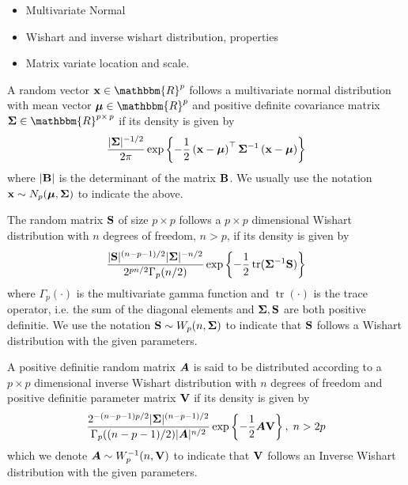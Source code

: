 \documentclass[]{book}\usepackage{knitr}
\begin{document}
\begin{itemize}
	\item Multivariate Normal
	\item Wishart and inverse wishart distribution, properties
	\item Matrix variate location and scale. 
\end{itemize}

\begin{definition}
	A random vector $\bx \in \mathbbm{R}^p$ follows a multivariate normal distribution with mean vector $\bmu \in \mathbbm{R}^p$ and positive definite covariance matrix  $\bSigma \in \mathbbm{R}^{p \times\, p}$ if its density is given by 
	\begin{equation}\label{eqn:multi_density}
	\frac{|\mathbf{\Sigma}|^{-1/2}}{2\pi} \exp \left\{-\frac{1}{2} \left(\mathbf{x} - \mbox{\boldmath$\mu$} \right)^\top\mathbf{\Sigma}^{-1}\left(\mathbf{x} - \mbox{\boldmath$\mu$} \right) \right\}
	\end{equation}
	where $|\mathbf{B}|$ is the determinant of the matrix $\mathbf{B}$. We usually use the notation $\mathbf{x} \sim N_p(\mbox{\boldmath$\mu$}, \mathbf{\Sigma})$ to indicate the above.
\end{definition} 

\begin{definition}
	The random matrix $\mathbf{S}$ of size $p \times p$ follows a $p\times p$ dimensional Wishart distribution with $n$ degrees of freedom, $n > p$, if its density is given by
	\begin{equation}\label{eqn:wishart_density}
	\frac{|\mathbf{S}|^{(n-p-1)/2} |\mathbf{\Sigma}|^{- n/2} }{2^{pn/2} \Gamma_p (n/2) } \exp\left\{-\frac{1}{2} \operatorname{tr}(\mathbf{\Sigma}^{-1}\mathbf{S})  \right\}
	\end{equation}
	where $ \Gamma_p (\cdot) $ is the multivariate gamma function and $\operatorname{tr}(\cdot)$ is the trace operator, i.e. the sum of the diagonal elements and $\mathbf{\Sigma}, \mathbf{S}$ are both positive definitie. We use the notation $\mathbf{S} \sim W_p(n, \mathbf{\Sigma})$ to indicate that $\mathbf{S}$ follows a Wishart distribution with the given parameters.
\end{definition}

\begin{definition}
	A positive definitie random matrix $\mbox{\boldmath$A$}$ is said to be distributed according to a $p\times p$ dimensional inverse Wishart distribution with $n$ degrees of freedom and positive definitie parameter matrix $\mathbf{V}$ if its density is given by
	\begin{equation}\label{eqn:inverse_wishart}
	\frac{2^{-(n-p-1)p/2} |\mathbf{\Sigma}|^{(n-p-1)/2} }{\Gamma_p ((n-p-1)/2) |\mbox{\boldmath$A$}|^{n/2}} \exp\left\{ -\frac{1}{2} \mbox{\boldmath$A$} \mathbf{V} \right\}, \; n> 2p
	\end{equation}
	which we denote $\mbox{\boldmath$A$} \sim W^{-1}_p(n, \mathbf{V})$ to indicate that $\mathbf{V}$ follows an Inverse Wishart distribution with the given parameters.
\end{definition}
\end{document}
